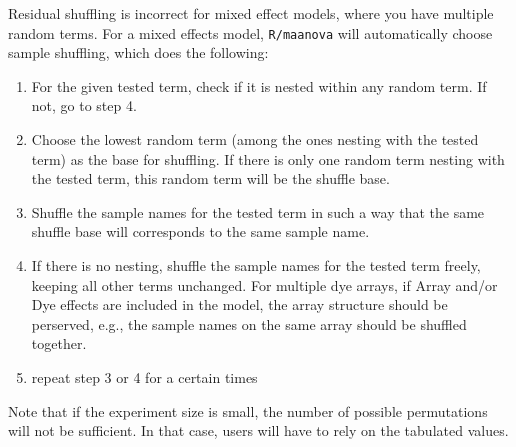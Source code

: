 Residual shuffling is incorrect for mixed effect models, 
where you have multiple random terms. For a mixed effects
model, {\tt R/maanova} will automatically choose sample
shuffling, which does the following:
\begin{enumerate}
\item For the given tested term, check if it is nested 
within any random term. If not, go to step 4.
\item Choose the lowest random term (among the ones 
nesting with the tested term) as the base for shuffling.
If there is only one random term nesting with the tested
term, this random term will be the shuffle base.
\item Shuffle the sample names for the tested term in such a way
that the same shuffle base will corresponds to the same 
sample name. 
\item If there is no nesting, shuffle the sample names for 
the tested term freely, keeping all other terms unchanged.
For multiple dye arrays, if Array and/or Dye effects are
included in the model, the array structure should be perserved,
e.g., the sample names on the same array should be shuffled
together. 
\item repeat step 3 or 4 for a certain times
\end{enumerate}

Note that if the experiment size is small, the number of 
possible permutations will not be sufficient. In that case,
users will have to rely on the tabulated values.
